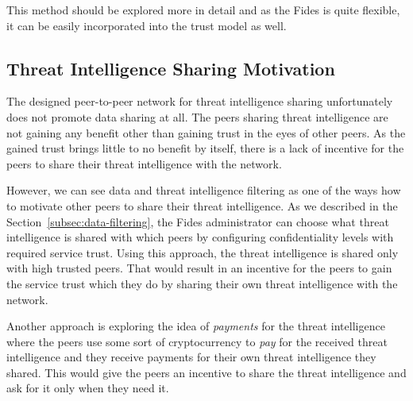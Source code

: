 This method should be explored more in detail and as the Fides is quite flexible, it can be easily incorporated into the trust model as well.

\subsection{Threat Intelligence Sharing Motivation}
\label{subsec:threat-intelligence-sharing-motivation}
The designed peer-to-peer network for threat intelligence sharing unfortunately does not promote data sharing at all.
The peers sharing threat intelligence are not gaining any benefit other than gaining trust in the eyes of other peers.
As the gained trust brings little to no benefit by itself, there is a lack of incentive for the peers to share their threat intelligence with the network.

However, we can see data and threat intelligence filtering as one of the ways how to motivate other peers to share their threat intelligence.
As we described in the Section~\ref{subsec:data-filtering}, the Fides administrator can choose what threat intelligence is shared with which peers by configuring confidentiality levels with required service trust.
Using this approach, the threat intelligence is shared only with high trusted peers.
That would result in an incentive for the peers to gain the service trust which they do by sharing their own threat intelligence with the network.

Another approach is exploring the idea of \textit{payments} for the threat intelligence where the peers use some sort of cryptocurrency to \textit{pay} for the received threat intelligence and they receive payments for their own threat intelligence they shared.
This would give the peers an incentive to share the threat intelligence and ask for it only when they need it.